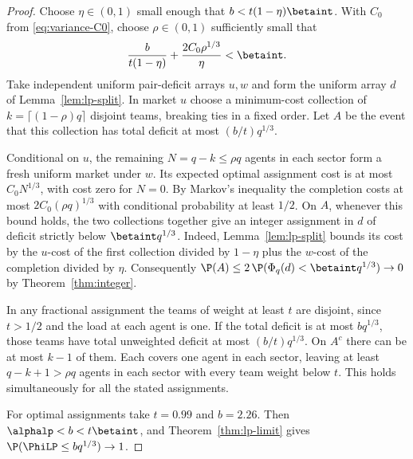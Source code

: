 \begin{proof}
Choose $\eta\in(0,1)$ small enough that $b<t(1-\eta)\betaint$. With $C_0$ from
\eqref{eq:variance-C0}, choose $\rho\in(0,1)$ sufficiently small that
\[
  \frac{b}{t(1-\eta)}+\frac{2C_0\rho^{1/3}}{\eta}<\betaint .
\]
Take independent uniform pair-deficit arrays $u,w$ and form the uniform array $d$
of Lemma~\ref{lem:lp-split}. In market $u$ choose a minimum-cost collection of
$k=\lceil(1-\rho)q\rceil$ disjoint teams, breaking ties in a fixed order. Let $A$
be the event that this collection has total deficit at most $(b/t)q^{1/3}$.

Conditional on $u$, the remaining $N=q-k\le\rho q$ agents in each sector form a
fresh uniform market under $w$. Its expected optimal assignment cost is at most
$C_0 N^{1/3}$, with cost zero for $N=0$. By Markov's inequality the completion
costs at most $2C_0(\rho q)^{1/3}$ with conditional probability at least $1/2$.
On $A$, whenever this bound holds, the two collections together give an integer
assignment in $d$ of deficit strictly below $\betaint q^{1/3}$. Indeed,
Lemma~\ref{lem:lp-split} bounds its cost by the $u$-cost of the first collection
divided by $1-\eta$ plus the $w$-cost of the completion divided by $\eta$.
Consequently $\P(A)\le2\,\P(\Phi_q(d)<\betaint q^{1/3})\to0$ by
Theorem~\ref{thm:integer}.

In any fractional assignment the teams of weight at least $t$ are disjoint, since
$t>1/2$ and the load at each agent is one. If the total deficit is at most
$bq^{1/3}$, those teams have total unweighted deficit at most $(b/t)q^{1/3}$.
On $A^c$ there can be at most $k-1$ of them. Each covers one agent in each
sector, leaving at least $q-k+1>\rho q$ agents in each sector with every team
weight below $t$. This holds simultaneously for all the stated assignments.

For optimal assignments take $t=0.99$ and $b=2.26$. Then
$\alphalp<b<t\betaint$, and Theorem~\ref{thm:lp-limit} gives
$\P(\PhiLP\le bq^{1/3})\to1$.
\end{proof}
